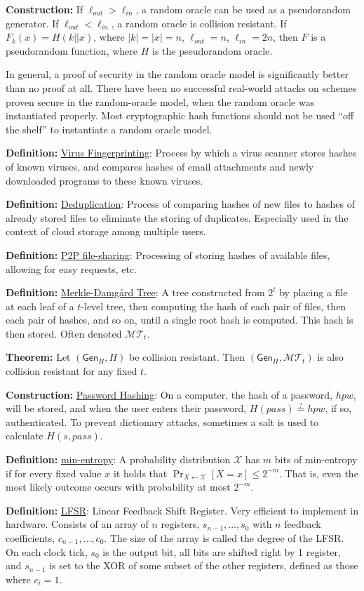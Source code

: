 \documentclass[10pt]{article}
\newcommand{\MMM}{\mathcal{M}}
\newcommand{\XXX}{\mathcal{X}}
\newcommand{\TTT}{\mathcal{T}}
\newcommand{\defn}[1]{{\bf Definition:} \underline{#1}}
\newcommand{\thm}[1]{{\bf Theorem:} \underline{#1}}
\newcommand{\con}[1]{{\bf Construction:} \underline{#1}}
\newcommand{\Gen}{\mathsf{Gen}}
\newcommand{\from}{\leftarrow}
\begin{document}
\begin{multicols}{4}
\con{} If $\ell_{out}>\ell_{in}$, a random oracle can be used as a pseudorandom generator. If $\ell_{out}<\ell_{in}$, a random oracle is collision resistant. If $F_k(x)=H(k||x)$, where $|k|=|x|=n$, $\ell_{out}=n$, $\ell_{in}=2n$, then $F$ is a pseudorandom function, where $H$ is the pseudorandom oracle.

In general, a proof of security in the random oracle model is significantly better than no proof at all. There have been no successful real-world attacks on schemes proven secure in the random-oracle model, when the random oracle was instantiated properly. Most cryptographic hash functions should not be used ``off the shelf'' to instantiate a random oracle model.

\defn{Virus Fingerprinting}: Process by which a virus scanner stores hashes of known viruses, and compares hashes of email attachments and newly downloaded programs to these known viruses.

\defn{Deduplication}: Process of comparing hashes of new files to hashes of already stored files to eliminate the storing of duplicates. Especially used in the context of cloud storage among multiple users.

\defn{P2P file-sharing}: Processing of storing hashes of available files, allowing for easy requests, etc.

\defn{Merkle-Damg\r{a}rd Tree}: A tree constructed from $2^t$ by placing a file at each leaf of a $t$-level tree, then computing the hash of each pair of files, then each pair of hashes, and so on, until a single root hash is computed. This hash is then stored. Often denoted $\MMM\TTT_t$.

\thm{}Let $(\Gen_H,H)$ be collision resistant. Then $(\Gen_H,\MMM\TTT_t)$ is also collision resistant for any fixed $t$.

\con{Password Hashing}: On a computer, the hash of a password, $hpw$, will be stored, and when the user enters their password, $H(pass)\overset{?}{=}hpw$, if so, authenticated. To prevent dictionary attacks, sometimes a salt is used to calculate $H(s,pass)$.

\defn{min-entropy}: A probability distribution $\XXX$ has $m$ bits of min-entropy if for every fixed value $x$ it holds that $\Pr_{X\from\XXX}[X=x]\leq2^{-m}$. That is, even the most likely outcome occurs with probability at most $2^{-m}$.

\defn{LFSR}: Linear Feedback Shift Register. Very efficient to implement in hardware. Consists of an array of $n$ registers, $s_{n-1},\dots,s_0$ with $n$ feedback coefficients, $c_{n-1},\dots,c_0$. The size of the array is called the degree of the LFSR. On each clock tick, $s_0$ is the output bit, all bits are shifted right by 1 register, and $s_{n-1}$ is set to the XOR of some subset of the other registers, defined as those where $c_i=1$.


\end{multicols}
\end{document}
